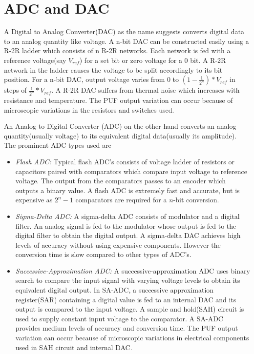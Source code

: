 \section{ADC and DAC}
A Digital to Analog Converter(DAC) as the name suggests converts digital data to an analog quantity like voltage. A n-bit DAC can be constructed easily using a R-2R ladder which consists of n R-2R networks. Each network is fed with a reference voltage(say $V_{ref}$) for a set bit or zero voltage for a 0 bit. A R-2R network in the ladder causes the voltage to be split accordingly to its bit position. For a n-bit DAC, output voltage varies from 0 to $(1-\frac{1}{2^{n}})*V_{ref}$ in steps of $\frac{1}{2^{n}}*V_{ref}$. A R-2R DAC suffers from thermal noise which increases with resistance and temperature. The PUF output variation can occur because of microscopic variations in the resistors and switches used.

An Analog to Digital Converter (ADC) on the other hand converts an analog quantity(usually voltage) to its equivalent digital data(usually its amplitude). The prominent ADC types used are
\begin{itemize}
\item \textit{Flash ADC:} Typical flash ADC's consists of voltage ladder of resistors or capacitors paired with comparators which compare input voltage to reference voltage. The output from the comparators passes to an encoder which outputs a binary value. A flash ADC is extremely fast and accurate, but is expensive as $2^{n}-1$ comparators are required for a $n$-bit conversion.
\item \textit{Sigma-Delta ADC:} A sigma-delta ADC consists of modulator and a digital filter. An analog signal is fed to the modulator whose output is fed to the digital filter to obtain the digital output. A sigma-delta DAC achieves high levels of accuracy without using expensive components. However the conversion time is slow compared to other types of ADC's.
\item \textit{Successive-Approximation ADC:} A successive-approximation ADC uses binary search to compare the input signal with varying voltage levels to obtain its equivalent digital output. In SA-ADC, a successive approximation register(SAR) containing a digital value is fed to an internal DAC and its output is compared to the input voltage. A sample and hold(SAH) circuit is used to supply constant input voltage to the comparator. A SA-ADC provides medium levels of accuracy and conversion time. The PUF output variation can occur because of microscopic variations in electrical components used in SAH circuit and internal DAC.

\end{itemize}

